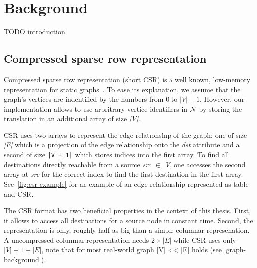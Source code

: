 \section{Background}\label{sec:background}

TODO introduction

\subsection{Compressed sparse row representation}\label{subsec:compressed-sparse-row-representation}
Compressed sparse row representation (short CSR) is a well known, low-memory representation for static graphs~\cite{csr,csr-first}.
To ease its explanation, we assume that the graph's vertices are indentified by the numbers from 0 to $|V| - 1$.
However, our implementation allows to use arbritrary vertice identifiers in $\mathcal{N}$ by storing the translation in an additional
array of size \textit{|V|}.

CSR uses two arrays to represent the edge relationship of the graph: one of size \textit{|E|} which is a projection of the edge relationship
onto the \textit{dst} attribute and a second of size \texttt{|V + 1|} which stores indices into the first array.
To find all destinations directly reachable from a source \textit{src $\in$ V}, one accesses the second array at \textit{src} for the
correct index to find the first destination in the first array.
See~\cref{fig:csr-example} for an example of an edge relationship represented as table and CSR.

The CSR format has two beneficial properties in the context of this thesis.
First, it allows to access all destinations for a source node in constant time.
Second, the representation is only, roughly half as big than a simple columnar represenation.
A uncompressed columnar representation needs $2 \times |E|$ while CSR uses only $|V| + 1 + |E|$, note that for most real-world graph |V|
<< |E| holds (see \cref{graph-background}).
